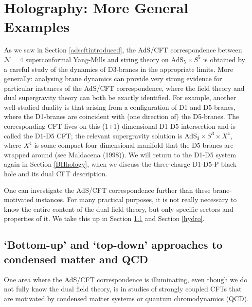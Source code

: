 \documentclass[12pt]{article}
\renewcommand{\^}[1]{\hat{#1}}
\begin{document}
\section{Holography: More General Examples}\label{hologeneral}

As we saw in Section \ref{adscftintroduced}, the AdS/CFT correspondence between $\mathcal{N}=4$ superconformal Yang-Mills and string theory on AdS$_5\times S^5$ is obtained by a careful study of the dynamics of D3-branes in the appropriate limits. More generally: analysing brane dynamics can provide very strong evidence for particular instances of the AdS/CFT correspondence, where the field theory and dual supergravity theory can both be exactly identified.
 For example, another well-studied duality is that arising from a configuration of D1 and D5-branes, where the D1-branes are coincident with (one direction of) the D5-branes. The corresponding CFT lives on this (1+1)-dimensional D1-D5 intersection and is called the D1-D5 CFT; the relevant supergravity solution is AdS$_3\times S^3\times X^4$, where $X^4$ is some compact four-dimensional manifold that the D5-branes are wrapped around (see Maldacena (1998)). 
 We will return to the D1-D5 system again in Section \ref{BHhology}, when we discuss the three-charge D1-D5-P black hole and its dual CFT description.

One can investigate the AdS/CFT correspondence further than these brane-motivated instances. For many practical purposes, it is not really necessary to know the entire content of the dual field theory, but only specific sectors and properties of it. We take this up in Section \ref{bottomup} and Section \ref{hydro}.

\subsection{`Bottom-up' and `top-down' approaches to condensed matter and QCD}\label{bottomup}
One area where the AdS/CFT correspondence is illuminating, even though we do not fully know the dual field theory, is in studies of strongly coupled CFTs that are motivated by condensed matter systems or quantum chromodynamics (QCD).
\end{document}
